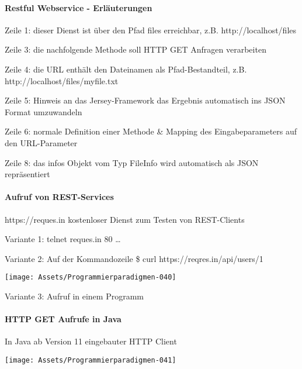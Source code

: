 \documentclass[10pt]{article}
\begin{document}
\paragraph{Restful Webservice - Erläuterungen}
\begin{itemize*}
  \item Zeile 1: dieser Dienst ist über den Pfad files erreichbar,
  z.B. http://localhost/files
  \item Zeile 3: die nachfolgende Methode soll HTTP GET Anfragen
  verarbeiten
  \item Zeile 4: die URL enthält den Dateinamen als
  Pfad-Bestandteil, z.B.
  http://localhost/files/myfile.txt
  \item Zeile 5: Hinweis an das Jersey-Framework das Ergebnis
  automatisch ins JSON Format umzuwandeln
  \item Zeile 6: normale Definition einer Methode \& Mapping des
  Eingabeparameters auf den URL-Parameter
  \item Zeile 8: das infos Objekt vom Typ FileInfo wird
  automatisch als JSON repräsentiert
\end{itemize*}

\paragraph{Aufruf von REST-Services}
https://reques.in kostenloser Dienst zum Testen von REST-Clients
\begin{itemize*}
  \item Variante 1: telnet reques.in 80 …
  \item Variante 2: Auf der Kommandozeile \newline
  \$ curl https://reqres.in/api/users/1
  \begin{center}
    \centering
    \texttt{[image: Assets/Programmierparadigmen-040]}
  \end{center}
  \item Variante 3: Aufruf in einem Programm
\end{itemize*}

\paragraph{HTTP GET Aufrufe in Java}
In Java ab Version 11 eingebauter HTTP Client
\begin{center}
  \centering
  \texttt{[image: Assets/Programmierparadigmen-041]}
\end{center}
\end{document}
